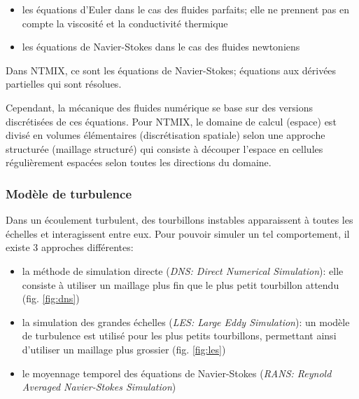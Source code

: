 \begin{itemize}
\item les équations d'Euler dans le cas des fluides parfaits; elle ne prennent pas en compte la viscosité et la conductivité thermique
\item les équations de Navier-Stokes dans le cas des fluides newtoniens
\end{itemize}


Dans NTMIX, ce sont les équations de Navier-Stokes; équations aux dérivées partielles qui sont résolues.

Cependant, la mécanique des fluides numérique se base sur des versions discrétisées de ces équations. Pour NTMIX, le domaine de calcul (espace) est divisé en volumes élémentaires (discrétisation spatiale) selon une approche structurée (maillage structuré) qui consiste à découper l'espace en cellules régulièrement espacées selon toutes les directions du domaine.


\subsubsection{Modèle de turbulence}
Dans un écoulement turbulent, des tourbillons instables apparaissent à toutes les échelles et interagissent entre eux. Pour pouvoir simuler un tel comportement, il existe 3 approches différentes:

\begin{itemize}
\item la méthode de simulation directe (\textit{DNS: Direct Numerical Simulation}): elle consiste à utiliser un maillage plus fin que le plus petit tourbillon attendu (fig. \ref{fig:dns})
\item la simulation des grandes échelles (\textit{LES: Large Eddy Simulation}): un modèle de turbulence est utilisé pour les plus petits tourbillons, permettant ainsi d'utiliser un maillage plus grossier (fig. \ref{fig:les})
\item le moyennage temporel des équations de Navier-Stokes (\textit{RANS: Reynold Averaged Navier-Stokes Simulation})
\end{itemize} 


